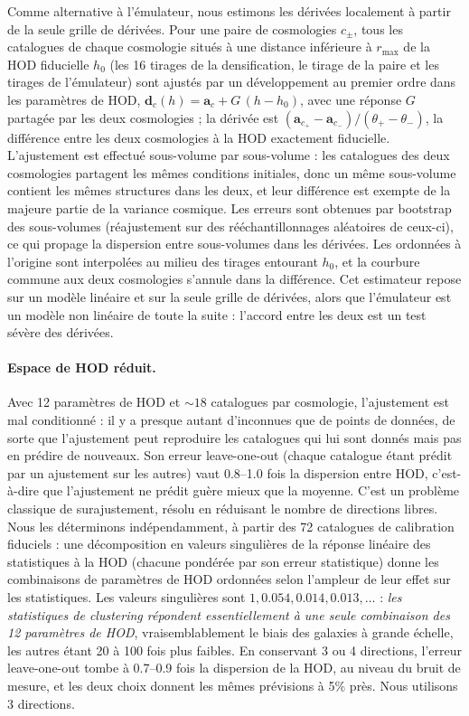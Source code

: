 Comme alternative à l'émulateur, nous estimons les dérivées localement à partir de la seule grille de dérivées. Pour une paire de cosmologies $c_\pm$, tous les catalogues de chaque cosmologie situés à une distance inférieure à $r_{\max}$ de la HOD fiducielle $h_0$ (les 16 tirages de la densification, le tirage de la paire et les tirages de l'émulateur) sont ajustés par un développement au premier ordre dans les paramètres de HOD, $\boldsymbol d_c(h) = \boldsymbol a_c + G\,(h-h_0)$, avec une réponse $G$ partagée par les deux cosmologies ; la dérivée est $(\boldsymbol a_{c_+}-\boldsymbol a_{c_-})/(\theta_+-\theta_-)$, la différence entre les deux cosmologies à la HOD exactement fiducielle. L'ajustement est effectué sous-volume par sous-volume : les catalogues des deux cosmologies partagent les mêmes conditions initiales, donc un même sous-volume contient les mêmes structures dans les deux, et leur différence est exempte de la majeure partie de la variance cosmique. Les erreurs sont obtenues par bootstrap des sous-volumes (réajustement sur des rééchantillonnages aléatoires de ceux-ci), ce qui propage la dispersion entre sous-volumes dans les dérivées. Les ordonnées à l'origine sont interpolées au milieu des tirages entourant $h_0$, et la courbure commune aux deux cosmologies s'annule dans la différence. Cet estimateur repose sur un modèle linéaire et sur la seule grille de dérivées, alors que l'émulateur est un modèle non linéaire de toute la suite : l'accord entre les deux est un test sévère des dérivées.

\paragraph{Espace de HOD réduit.} Avec 12 paramètres de HOD et $\sim18$ catalogues par cosmologie, l'ajustement est mal conditionné : il y a presque autant d'inconnues que de points de données, de sorte que l'ajustement peut reproduire les catalogues qui lui sont donnés mais pas en prédire de nouveaux. Son erreur leave-one-out (chaque catalogue étant prédit par un ajustement sur les autres) vaut 0.8--1.0 fois la dispersion entre HOD, c'est-à-dire que l'ajustement ne prédit guère mieux que la moyenne. C'est un problème classique de surajustement, résolu en réduisant le nombre de directions libres. Nous les déterminons indépendamment, à partir des 72 catalogues de calibration fiduciels : une décomposition en valeurs singulières de la réponse linéaire des statistiques à la HOD (chacune pondérée par son erreur statistique) donne les combinaisons de paramètres de HOD ordonnées selon l'ampleur de leur effet sur les statistiques. Les valeurs singulières sont $1, 0.054, 0.014, 0.013,\dots$ : \emph{les statistiques de clustering répondent essentiellement à une seule combinaison des 12 paramètres de HOD}, vraisemblablement le biais des galaxies à grande échelle, les autres étant 20 à 100 fois plus faibles. En conservant 3 ou 4 directions, l'erreur leave-one-out tombe à 0.7--0.9 fois la dispersion de la HOD, au niveau du bruit de mesure, et les deux choix donnent les mêmes prévisions à 5\% près. Nous utilisons 3 directions.

